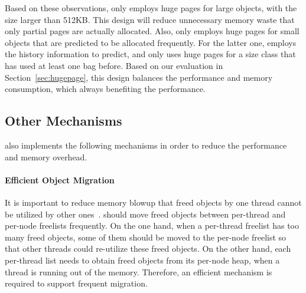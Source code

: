 Based on these observations,  \NM{} only employs huge pages for large objects, with the size larger than 512KB. This design will reduce unnecessary memory waste that only partial pages are actually allocated. Also, \NM{} only employs huge pages for small objects that are predicted to be allocated frequently. For the latter one, \NM{} employs the history information to predict, and only uses huge pages for a size class that has used at least one bag before. Based on our evaluation in Section~\ref{sec:hugepage}, this design balances the performance and memory consumption, which always benefiting the performance. 



\subsection{Other Mechanisms}
\label{sec: others}

\NM{} also implements the following mechanisms in order to reduce the performance and memory overhead. 

\paragraph{Efficient Object Migration} It is important to reduce memory blowup that freed objects by one thread cannot be utilized by other ones~\citep{Hoard}.  \NM{} should move freed objects between per-thread and per-node freelists frequently. On the one hand, when a per-thread freelist has too many freed objects, some of them should be moved to the per-node freelist so that other threads could re-utilize these freed objects. On the other hand, each per-thread list needs to obtain freed objects from its per-node heap, when a thread is running out of the memory. 
Therefore, an efficient mechanism is required to support frequent migration. 

